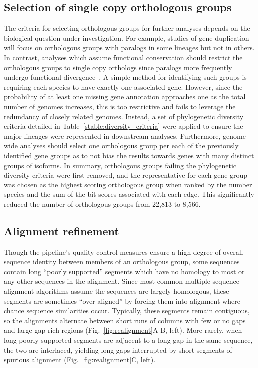 \subsection*{Selection of single copy orthologous groups}
The criteria for selecting orthologous groups for further analyses depends on the biological question under investigation. For example, studies of gene duplication will focus on orthologous groups with paralogs in some lineages but not in others. In contrast, analyses which assume functional conservation should restrict the orthologous groups to single copy orthologs since paralogs more frequently undergo functional divergence~\cite{Altenhoff2012, Pegueroles2013, Soria2014}. A simple method for identifying such groups is requiring each species to have exactly one associated gene. However, since the probability of at least one missing gene annotation approaches one as the total number of genomes increases, this is too restrictive and fails to leverage the redundancy of closely related genomes. Instead, a set of phylogenetic diversity criteria detailed in Table~\ref{stable:diversity_criteria} were applied to ensure the major lineages were represented in downstream analyses. Furthermore, genome-wide analyses should select one orthologous group per each of the previously identified gene groups as to not bias the results towards genes with many distinct groups of isoforms. In summary, orthologous groups failing the phylogenetic diversity criteria were first removed, and the representative for each gene group was chosen as the highest scoring orthologous group when ranked by the number species and the sum of the bit scores associated with each edge. This significantly reduced the number of orthologous groups from 22,813 to 8,566.

\subsection*{Alignment refinement}
Though the pipeline’s quality control measures ensure a high degree of overall sequence identity between members of an orthologous group, some sequences contain long ``poorly supported'' segments which have no homology to most or any other sequences in the alignment. Since most common multiple sequence alignment algorithms assume the sequences are largely homologous, these segments are sometimes ``over-aligned'' by forcing them into alignment where chance sequence similarities occur. Typically, these segments remain contiguous, so the alignments alternate between short runs of columns with few or no gaps and large gap-rich regions (Fig.~\ref{fig:realignment}A-B, left). More rarely, when long poorly supported segments are adjacent to a long gap in the same sequence, the two are interlaced, yielding long gaps interrupted by short segments of spurious alignment (Fig.~\ref{fig:realignment}C, left).

